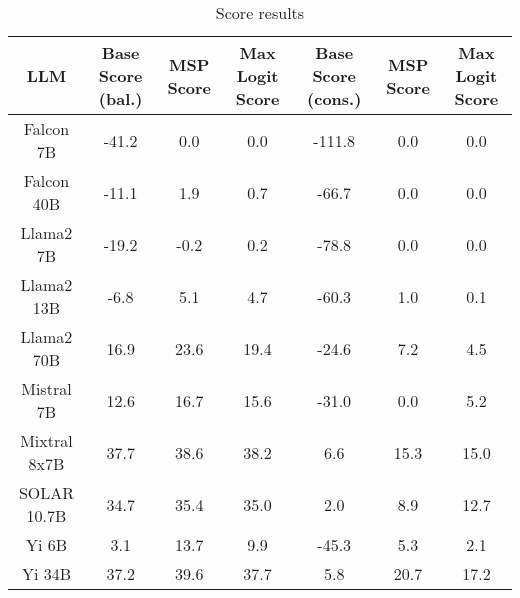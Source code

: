 \renewcommand\arraystretch{1.2}
\begin{table*}
\centering
\begin{tabular}{c|c|c|c|c|c|c}
LLM & Base Score (bal.) & MSP Score & Max Logit Score & Base Score (cons.) & MSP Score & Max Logit Score\\ \hline
Falcon 7B & -41.2 & 0.0 & 0.0 & -111.8 & 0.0 & 0.0\\
Falcon 40B & -11.1 & 1.9 & 0.7 & -66.7 & 0.0 & 0.0\\
Llama2 7B & -19.2 & -0.2 & 0.2 & -78.8 & 0.0 & 0.0\\
Llama2 13B & -6.8 & 5.1 & 4.7 & -60.3 & 1.0 & 0.1\\
Llama2 70B & 16.9 & 23.6 & 19.4 & -24.6 & 7.2 & 4.5\\
Mistral 7B & 12.6 & 16.7 & 15.6 & -31.0 & 0.0 & 5.2\\
Mixtral 8x7B & 37.7 & 38.6 & 38.2 & 6.6 & 15.3 & 15.0\\
SOLAR 10.7B & 34.7 & 35.4 & 35.0 & 2.0 & 8.9 & 12.7\\
Yi 6B & 3.1 & 13.7 & 9.9 & -45.3 & 5.3 & 2.1\\
Yi 34B & 37.2 & 39.6 & 37.7 & 5.8 & 20.7 & 17.2\\
\hline
\end{tabular}
\caption{Score results}
\end{table*}
\label{tab:score}
